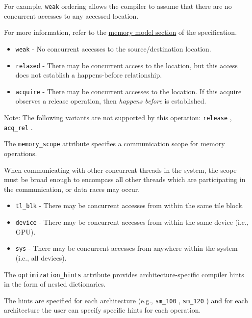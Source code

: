 \documentclass{article}
\begin{document}
For example, \texttt{weak} ordering allows the compiler to assume that there are no concurrent accesses to any accessed location.

For more information, refer to the \href{https://docs.nvidia.com/cuda/tile-ir/latest/sections/memory_model.html#section-memory-model}{memory model section} of the specification.


\begin{itemize}
\item \texttt{weak} - No concurrent accesses to the source/destination location.
\item \texttt{relaxed} - There may be concurrent access to the location, but this access does not establish a happens-before relationship.
\item \texttt{acquire} -  There may be concurrent accesses to the location. If this acquire observes a release operation, then \textit{happens before} is established.

\end{itemize}
Note: The following variants are not supported by this operation: \texttt{release} , \texttt{acq\_rel} .


The \texttt{memory\_scope} attribute specifies a communication scope for memory operations.

When communicating with other concurrent threads in the system, the scope must be broad enough to encompass all other threads which are participating in the communication, or data races may occur.


\begin{itemize}
\item \texttt{tl\_blk} - There may be concurrent accesses from within the same tile block.
\item \texttt{device} - There may be concurrent accesses from within the same device (i.e., GPU).
\item \texttt{sys} - There may be concurrent accesses from anywhere within the system (i.e., all devices).

\end{itemize}
The \texttt{optimization\_hints} attribute provides architecture-specific compiler hints in the form of nested dictionaries.


The hints are specified for each architecture (e.g., \texttt{sm\_100} , \texttt{sm\_120} ) and for each architecture the user can specify specific hints for each operation.
\end{document}
